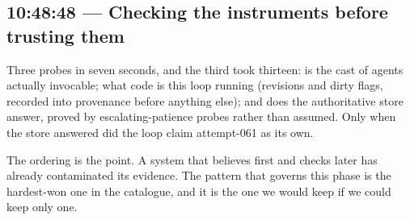 \subsection*{10:48:48 --- Checking the instruments before trusting them}

Three probes in seven seconds, and the third took thirteen: is the cast of
agents actually invocable; what code is this loop running (revisions and dirty
flags, recorded into provenance before anything else); and does the
authoritative store answer, proved by escalating-patience probes rather than
assumed.  Only when the store answered did the loop claim attempt-061 as its
own.

The ordering is the point.  A system that believes first and checks later has
already contaminated its evidence.  The pattern that governs this phase is the
hardest-won one in the catalogue, and it is the one we would keep if we could
keep only one.

